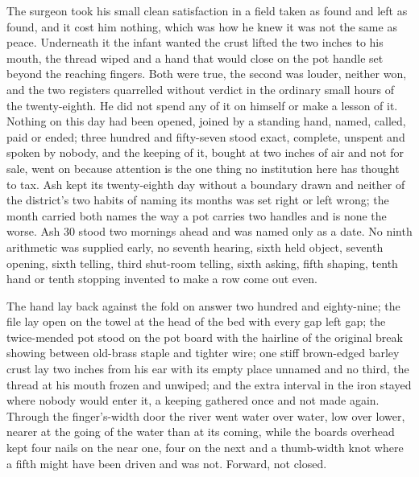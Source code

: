 The surgeon took his small clean satisfaction in a field taken as found and left as found, and it cost him nothing, which was how he knew it was not the same as peace. Underneath it the infant wanted the crust lifted the two inches to his mouth, the thread wiped and a hand that would close on the pot handle set beyond the reaching fingers. Both were true, the second was louder, neither won, and the two registers quarrelled without verdict in the ordinary small hours of the twenty-eighth. He did not spend any of it on himself or make a lesson of it. Nothing on this day had been opened, joined by a standing hand, named, called, paid or ended; three hundred and fifty-seven stood exact, complete, unspent and spoken by nobody, and the keeping of it, bought at two inches of air and not for sale, went on because attention is the one thing no institution here has thought to tax. Ash kept its twenty-eighth day without a boundary drawn and neither of the district's two habits of naming its months was set right or left wrong; the month carried both names the way a pot carries two handles and is none the worse. Ash 30 stood two mornings ahead and was named only as a date. No ninth arithmetic was supplied early, no seventh hearing, sixth held object, seventh opening, sixth telling, third shut-room telling, sixth asking, fifth shaping, tenth hand or tenth stopping invented to make a row come out even.

The hand lay back against the fold on answer two hundred and eighty-nine; the file lay open on the towel at the head of the bed with every gap left gap; the twice-mended pot stood on the pot board with the hairline of the original break showing between old-brass staple and tighter wire; one stiff brown-edged barley crust lay two inches from his ear with its empty place unnamed and no third, the thread at his mouth frozen and unwiped; and the extra interval in the iron stayed where nobody would enter it, a keeping gathered once and not made again. Through the finger's-width door the river went water over water, low over lower, nearer at the going of the water than at its coming, while the boards overhead kept four nails on the near one, four on the next and a thumb-width knot where a fifth might have been driven and was not. Forward, not closed.
